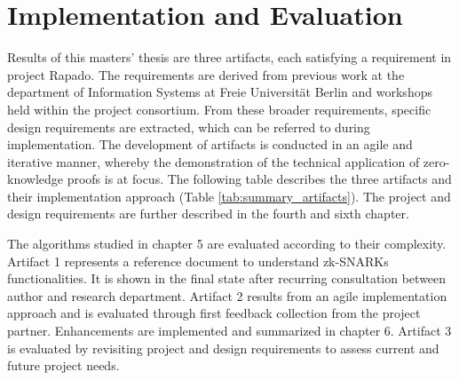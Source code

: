 \section{Implementation and Evaluation}
Results of this masters' thesis are three artifacts, each satisfying a requirement in project Rapado. The requirements are derived from previous work at the department of Information Systems at Freie Universit{\"a}t Berlin and workshops held within the project consortium. From these broader requirements, specific design requirements are extracted, which can be referred to during implementation. The development of artifacts is conducted in an agile and iterative manner, whereby the demonstration of the technical application of zero-knowledge proofs is at focus. The following table describes the three artifacts and their implementation approach (Table \ref{tab:summary_artifacts}). The project and design requirements are further described in the fourth and sixth chapter. 

The algorithms studied in chapter 5 are evaluated according to their complexity. Artifact 1 represents a reference document to understand zk-SNARKs functionalities. It is shown in the final state after recurring consultation between author and research department. Artifact 2 results from an agile implementation approach and is evaluated through first feedback collection from the project partner. Enhancements are implemented and summarized in chapter 6. Artifact 3 is evaluated by revisiting project and design requirements to assess current and future project needs. 

